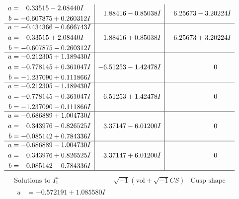 \documentclass[1p]{elsarticle_modified}
\theoremstyle{definition}
\newcommand{\I}{\sqrt{-1}}
\begin{document}
$$\begin{array}{c|c|c}
\begin{aligned}
a &= \phantom{-}0.33515 - 2.08440 I \\
b &= -0.607875 + 0.260312 I\end{aligned}
 & \phantom{-}1.88416 - 0.85038 I & \phantom{-}6.25673 - 3.20224 I \\ \hline\begin{aligned}
u &= -0.434366 - 0.666743 I \\
a &= \phantom{-}0.33515 + 2.08440 I \\
b &= -0.607875 - 0.260312 I\end{aligned}
 & \phantom{-}1.88416 + 0.85038 I & \phantom{-}6.25673 + 3.20224 I \\ \hline\begin{aligned}
u &= -0.212305 + 1.189430 I \\
a &= -0.778145 + 0.361047 I \\
b &= -1.237090 + 0.111866 I\end{aligned}
 & -6.51253 - 1.42478 I & \phantom{-0.000000 } 0 \\ \hline\begin{aligned}
u &= -0.212305 - 1.189430 I \\
a &= -0.778145 - 0.361047 I \\
b &= -1.237090 - 0.111866 I\end{aligned}
 & -6.51253 + 1.42478 I & \phantom{-0.000000 } 0 \\ \hline\begin{aligned}
u &= -0.686889 + 1.004730 I \\
a &= \phantom{-}0.343976 - 0.826525 I \\
b &= -0.085142 + 0.784336 I\end{aligned}
 & \phantom{-}3.37147 - 6.01200 I & \phantom{-0.000000 } 0 \\ \hline\begin{aligned}
u &= -0.686889 - 1.004730 I \\
a &= \phantom{-}0.343976 + 0.826525 I \\
b &= -0.085142 - 0.784336 I\end{aligned}
 & \phantom{-}3.37147 + 6.01200 I & \phantom{-0.000000 } 0\\
 \hline 
 \end{array}$$\newpage$$\begin{array}{c|c|c}  
\text{Solutions to }I^u_{1}& \I (\text{vol} + \sqrt{-1}CS) & \text{Cusp shape}\\
 \hline 
\begin{aligned}
u &= -0.572191 + 1.085580 I \\

\end{aligned}
\end{array}$$
\end{document}
